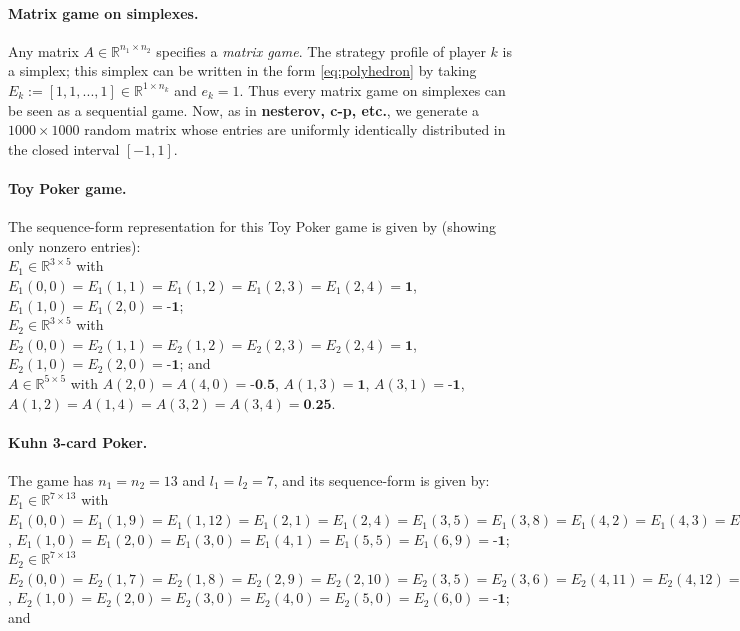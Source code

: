 \documentclass[envcountsame]{llcns2e/llncs}
\begin{document}
\paragraph{\textbf{Matrix game on simplexes.}}
Any matrix $A \in \mathbb{R}^{n_1 \times n_2}$ specifies a
\textit{matrix game}. The strategy profile of player $k$ is a simplex;
this simplex can be written in the form \eqref{eq:polyhedron} by
taking $E_k := [1, 1, ..., 1] \in \mathbb{R}^{1 \times n_k}$ and $e_k
= 1$. Thus every matrix game on simplexes can be seen as a sequential
game. Now, as in \textbf{nesterov, c-p, etc.}, we generate a $1000
\times 1000$ random matrix whose entries are uniformly identically
distributed in the closed interval $[-1, 1]$.

\paragraph{\textbf{Toy Poker game.}}
The sequence-form representation for this Toy Poker game is given by
(showing only nonzero entries):\\

$E_1 \in \mathbb{R}^{3 \times 5}$ with $E_1(0,0) = E_1(1,1) =
E_1(1,2) = E_1(2,3) = E_1(2,4) = \textbf{1}$,
$E_1(1,0) = E_1(2,0) = \textbf{-1}$; \\

$E_2 \in \mathbb{R}^{3 \times 5}$ with $E_2(0,0) = E_2(1,1) = E_2(1,2)
= E_2(2,3) = E_2(2,4) = \textbf{1}$, $E_2(1,0) = E_2(2,0) =
\textbf{-1}$; and \\

$A \in \mathbb{R}^{5 \times 5}$ with $A(2,0) =
A(4,0) = \textbf{-0.5}$, $A(1,3) = \textbf{1}$, $A(3,1) =
\textbf{-1}$, $A(1,2) = A(1,4) = A(3,2) = A(3,4) = \textbf{0.25}$.


\paragraph{\textbf{Kuhn 3-card Poker.}}
The game has $n_1 = n_2 = 13$ and $l_1 = l_2 = 7$, and its
sequence-form is given by:\\

$E_1 \in \mathbb{R}^{7 \times 13}$ with $E_1(0,0) = E_1(1,9) =
E_1(1,12) = E_1(2,1) = E_1(2,4) = E_1(3,5) =
E_1(3,8) = E_1(4,2) = E_1(4,3) = E_1(5,6) = E_1(5,7) = E_1(6,10) =
E_1(6,11) = \textbf{1}$, $E_1(1,0) = E_1(2,0) = E_1(3,0) = E_1(4,1) =
E_1(5,5) = E_1(6,9) = \textbf{-1}$; \\

 $E_2 \in \mathbb{R}^{7 \times 13}$
$E_2(0,0) = E_2(1,7) = E_2(1,8) = E_2(2,9) = E_2(2,10) = E_2(3,5) =
E_2(3,6) = E_2(4,11) = E_2(4,12) = E_2(5,1) = E_2(5,2) = E_2(6,3) =
E_2(6,4) = \textbf{1}$, $E_2(1,0) = E_2(2,0) = E_2(3,0) = E_2(4,0) =
E_2(5,0) = E_2(6,0) = \textbf{-1}$; and \\
\end{document}
